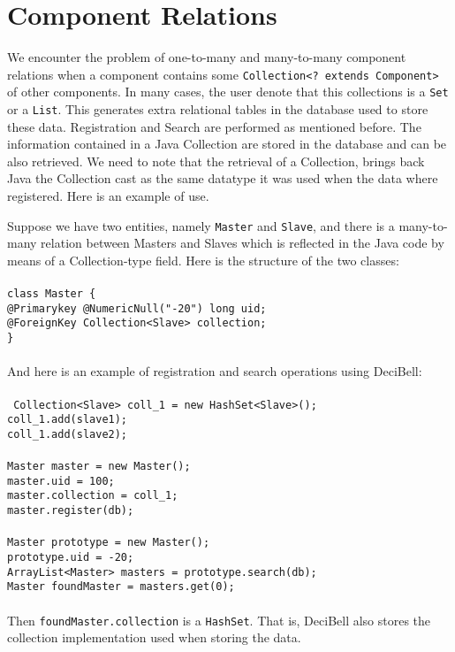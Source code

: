 \documentclass[a4paper,10pt]{article}
\begin{document}
\section*{Component Relations}
We encounter the problem of one-to-many and many-to-many component 
relations when a component contains some \texttt{Collection<? extends Component>} 
of other components. In many cases, the user denote that this collections 
is a \texttt{Set} or a \texttt{List}. 
This generates extra relational tables in the database used to store these data. 
Registration and Search are performed as mentioned before. The information contained
in a Java Collection are stored in the database and can be also retrieved. We need
to note that the retrieval of a Collection, brings back Java the Collection cast 
as the same datatype it was used when the data where registered. Here is an example 
of use. 

Suppose we have two entities, namely \texttt{Master} and \texttt{Slave}, and there is 
a many-to-many relation between Masters and Slaves which is reflected in the Java code
by means of a Collection-type field. Here is the structure of the two classes:\\\\
\texttt{class Master \{\\
\hspace*{6} @Primarykey @NumericNull("-20") long uid;\\
\hspace*{6} @ForeignKey Collection<Slave> collection;\\
\}\\
}\\
\noindent
And here is an example of registration and search operations using DeciBell:\\\\
\texttt{
 Collection<Slave> coll\_1 = new HashSet<Slave>();\\
 coll\_1.add(slave1);\\
 coll\_1.add(slave2);\\\\
 Master master = new Master();\\
 master.uid = 100;\\
 master.collection = coll\_1;\\
 master.register(db);\\\\
 Master prototype = new Master();\\
 prototype.uid = -20;\\
 ArrayList<Master> masters = prototype.search(db);\\
 Master foundMaster = masters.get(0);\\\\
}
Then \texttt{foundMaster.collection} is a \texttt{HashSet}. That is,
DeciBell also stores the collection implementation used when storing the 
data.
\end{document}
